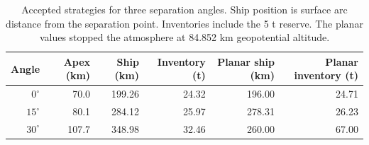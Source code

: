 \begin{table}[htbp]
\centering
\caption{Accepted strategies for three separation angles. Ship position is surface arc distance from the separation point. Inventories include the 5 t reserve. The planar values stopped the atmosphere at 84.852 km geopotential altitude.}
\label{tab:p2-separation-angle}
\small
\begin{tabular}{@{}rrrrrr@{}}
\toprule
Angle & Apex (km) & Ship (km) & Inventory (t) & Planar ship (km) & Planar inventory (t) \\
\midrule
$0^\circ$ & 70.0 & 199.26 & 24.32 & 196.00 & 24.71 \\
$15^\circ$ & 80.1 & 284.12 & 25.97 & 278.31 & 26.23 \\
$30^\circ$ & 107.7 & 348.98 & 32.46 & 260.00 & 67.00 \\
\bottomrule
\end{tabular}
\end{table}

